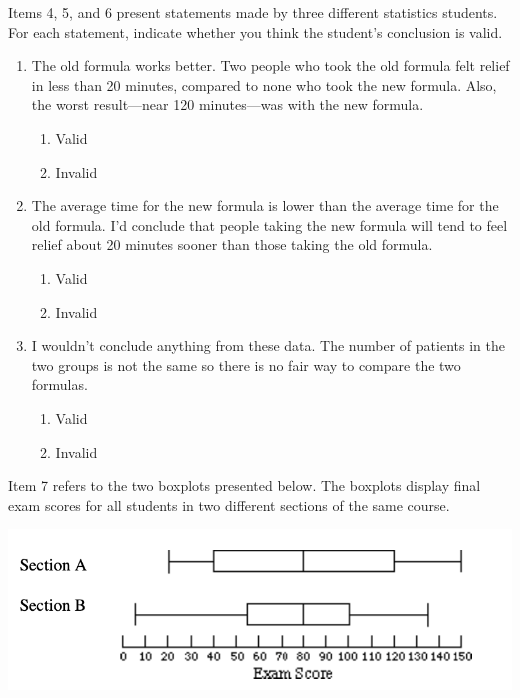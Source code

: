 \documentclass[11pt]{umnthesis}
\begin{document}
\noindent Items 4, 5, and 6 present statements made by three different statistics students. For each statement, indicate whether you think the student's conclusion is valid.

\begin{enumerate}
\def\labelenumi{\arabic{enumi}.}
\setcounter{enumi}{3}
\tightlist
\item
  The old formula works better. Two people who took the old formula felt relief in less than 20 minutes, compared to none who took the new formula. Also, the worst result---near 120 minutes---was with the new formula.

  \begin{enumerate}
  \def\labelenumii{\alph{enumii}.}
  \tightlist
  \item
    Valid
  \item
    Invalid
  \end{enumerate}
\item
  The average time for the new formula is lower than the average time for the old formula. I'd conclude that people taking the new formula will tend to feel relief about 20 minutes sooner than those taking the old formula.

  \begin{enumerate}
  \def\labelenumii{\alph{enumii}.}
  \tightlist
  \item
    Valid
  \item
    Invalid
  \end{enumerate}
\item
  I wouldn't conclude anything from these data. The number of patients in the two groups is not the same so there is no fair way to compare the two formulas.

  \begin{enumerate}
  \def\labelenumii{\alph{enumii}.}
  \tightlist
  \item
    Valid
  \item
    Invalid
  \end{enumerate}
\end{enumerate}

\noindent Item 7 refers to the two boxplots presented below. The boxplots display final exam scores for all students in two different sections of the same course.

\begin{center}\includegraphics[width=0.8\linewidth]{figure/drs-07} \end{center}
\end{document}
